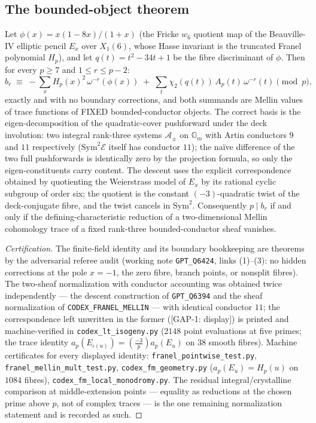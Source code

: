 \subsection{The bounded-object theorem}

\begin{theorem}\label{thm:bounded-object}
Let $\phi(x)=x(1-8x)/(1+x)$ (the Fricke $w_6$ quotient map of the
Beauville-IV elliptic pencil $E_x$ over $X_1(6)$, whose Hasse invariant is
the truncated Franel polynomial $H_p$), and let $q(t)=t^2-34t+1$ be the
fibre discriminant of $\phi$.  Then for every $p\ge7$ and $1\le r\le p-2$:
\[
b_r\;\equiv\;-\sum_{x}H_p(x)^2\,\omega^{-r}(\phi(x))
\;+\;\sum_{t}\chi_2(q(t))\,A_p(t)\,\omega^{-r}(t)\pmod p,
\]
exactly and with no boundary corrections, and both summands are Mellin
values of trace functions of FIXED bounded-conductor objects.  The correct
basis is the eigen-decomposition of the quadratic-cover pushforward under
the deck involution: two integral rank-three systems $\mathcal A_\pm$ on
$\mathbb G_m$ with Artin conductors $9$ and $11$ respectively
($\mathrm{Sym}^2\mathcal E$ itself has conductor $11$); the na\"ive
difference of the two full pushforwards is identically zero by the
projection formula, so only the eigen-constituents carry content.  The descent uses the explicit correspondence
obtained by quotienting the Weierstrass model of $E_x$ by its rational
cyclic subgroup of order six; the quotient is the constant $(-3)$-quadratic
twist of the deck-conjugate fibre, and the twist cancels in
$\mathrm{Sym}^2$.  Consequently $p\mid b_r$ if and only if the
defining-characteristic reduction of a two-dimensional Mellin cohomology
trace of a fixed rank-three bounded-conductor sheaf vanishes.
\end{theorem}

\begin{proof}[Certification]
The finite-field identity and its boundary bookkeeping are theorems by the
adversarial referee audit (working note \texttt{GPT\_Q6424}, links (1)--(3):
no hidden corrections at the pole $x=-1$, the zero fibre, branch points, or
nonsplit fibres).  The two-sheaf normalization with conductor accounting was
obtained twice independently — the descent construction of
\texttt{GPT\_Q6394} and the sheaf normalization of
\texttt{CODEX\_FRANEL\_MELLIN} — with identical conductor $11$; the
correspondence left unwritten in the former ([GAP-1: display]) is printed
and machine-verified in \texttt{codex\_lt\_isogeny.py} ($2148$ point
evaluations at five primes; the trace identity
$a_p(E_{\iota(u)})=(\tfrac{-3}p)a_p(E_u)$ on $38$ smooth fibres).  Machine
certificates for every displayed identity:
\texttt{franel\_pointwise\_test.py}, \texttt{franel\_mellin\_mult\_test.py},
\texttt{codex\_fm\_geometry.py} ($a_p(E_u)=H_p(u)$ on $1084$ fibres),
\texttt{codex\_fm\_local\_monodromy.py}.  The residual integral/crystalline
comparison at middle-extension points — equality as reductions at the
chosen prime above $p$, not of complex traces — is the one remaining
normalization statement and is recorded as such.
\end{proof}

